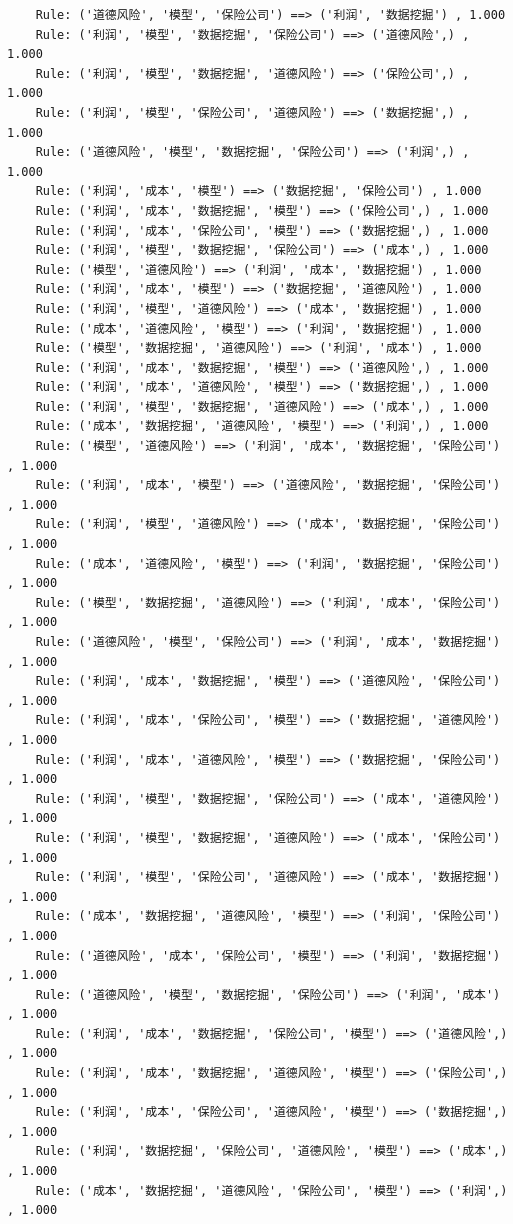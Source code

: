 \documentclass[lang=cn,11pt,a4paper,cite=authoryear]{elegantpaper}
\begin{document}
\begin{lstlisting}
	Rule: ('道德风险', '模型', '保险公司') ==> ('利润', '数据挖掘') , 1.000
	Rule: ('利润', '模型', '数据挖掘', '保险公司') ==> ('道德风险',) , 1.000
	Rule: ('利润', '模型', '数据挖掘', '道德风险') ==> ('保险公司',) , 1.000
	Rule: ('利润', '模型', '保险公司', '道德风险') ==> ('数据挖掘',) , 1.000
	Rule: ('道德风险', '模型', '数据挖掘', '保险公司') ==> ('利润',) , 1.000
	Rule: ('利润', '成本', '模型') ==> ('数据挖掘', '保险公司') , 1.000
	Rule: ('利润', '成本', '数据挖掘', '模型') ==> ('保险公司',) , 1.000
	Rule: ('利润', '成本', '保险公司', '模型') ==> ('数据挖掘',) , 1.000
	Rule: ('利润', '模型', '数据挖掘', '保险公司') ==> ('成本',) , 1.000
	Rule: ('模型', '道德风险') ==> ('利润', '成本', '数据挖掘') , 1.000
	Rule: ('利润', '成本', '模型') ==> ('数据挖掘', '道德风险') , 1.000
	Rule: ('利润', '模型', '道德风险') ==> ('成本', '数据挖掘') , 1.000
	Rule: ('成本', '道德风险', '模型') ==> ('利润', '数据挖掘') , 1.000
	Rule: ('模型', '数据挖掘', '道德风险') ==> ('利润', '成本') , 1.000
	Rule: ('利润', '成本', '数据挖掘', '模型') ==> ('道德风险',) , 1.000
	Rule: ('利润', '成本', '道德风险', '模型') ==> ('数据挖掘',) , 1.000
	Rule: ('利润', '模型', '数据挖掘', '道德风险') ==> ('成本',) , 1.000
	Rule: ('成本', '数据挖掘', '道德风险', '模型') ==> ('利润',) , 1.000
	Rule: ('模型', '道德风险') ==> ('利润', '成本', '数据挖掘', '保险公司') , 1.000
	Rule: ('利润', '成本', '模型') ==> ('道德风险', '数据挖掘', '保险公司') , 1.000
	Rule: ('利润', '模型', '道德风险') ==> ('成本', '数据挖掘', '保险公司') , 1.000
	Rule: ('成本', '道德风险', '模型') ==> ('利润', '数据挖掘', '保险公司') , 1.000
	Rule: ('模型', '数据挖掘', '道德风险') ==> ('利润', '成本', '保险公司') , 1.000
	Rule: ('道德风险', '模型', '保险公司') ==> ('利润', '成本', '数据挖掘') , 1.000
	Rule: ('利润', '成本', '数据挖掘', '模型') ==> ('道德风险', '保险公司') , 1.000
	Rule: ('利润', '成本', '保险公司', '模型') ==> ('数据挖掘', '道德风险') , 1.000
	Rule: ('利润', '成本', '道德风险', '模型') ==> ('数据挖掘', '保险公司') , 1.000
	Rule: ('利润', '模型', '数据挖掘', '保险公司') ==> ('成本', '道德风险') , 1.000
	Rule: ('利润', '模型', '数据挖掘', '道德风险') ==> ('成本', '保险公司') , 1.000
	Rule: ('利润', '模型', '保险公司', '道德风险') ==> ('成本', '数据挖掘') , 1.000
	Rule: ('成本', '数据挖掘', '道德风险', '模型') ==> ('利润', '保险公司') , 1.000
	Rule: ('道德风险', '成本', '保险公司', '模型') ==> ('利润', '数据挖掘') , 1.000
	Rule: ('道德风险', '模型', '数据挖掘', '保险公司') ==> ('利润', '成本') , 1.000
	Rule: ('利润', '成本', '数据挖掘', '保险公司', '模型') ==> ('道德风险',) , 1.000
	Rule: ('利润', '成本', '数据挖掘', '道德风险', '模型') ==> ('保险公司',) , 1.000
	Rule: ('利润', '成本', '保险公司', '道德风险', '模型') ==> ('数据挖掘',) , 1.000
	Rule: ('利润', '数据挖掘', '保险公司', '道德风险', '模型') ==> ('成本',) , 1.000
	Rule: ('成本', '数据挖掘', '道德风险', '保险公司', '模型') ==> ('利润',) , 1.000
\end{lstlisting}
\end{document}
